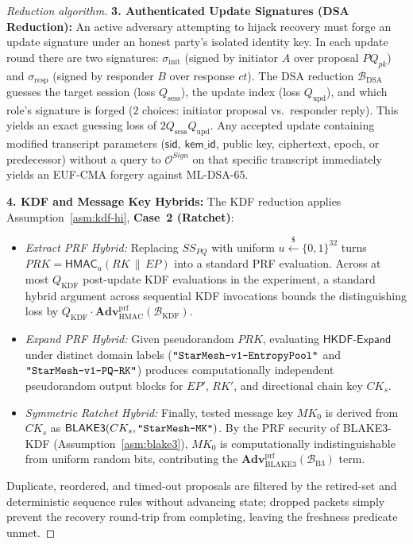 \documentclass[11pt,a4paper]{article}
\theoremstyle{remark}
\theoremstyle{plain}
\newcommand{\Adv}{\mathbf{Adv}}
\newcommand{\calO}{\mathcal{O}}
\newcommand{\bits}{\{0,1\}}
\newcommand{\getsr}{\stackrel{\$}{\leftarrow}}
\newcommand{\HKDFExpand}{\mathsf{HKDF\text{-}Expand}}
\newcommand{\HMAC}{\mathsf{HMAC}}
\newcommand{\strlit}[1]{\text{\upshape\texttt{"#1"}}}
\begin{document}
\begin{proof}[Reduction algorithm]
\medskip\noindent
\textbf{3. Authenticated Update Signatures (DSA Reduction):}
An active adversary attempting to hijack recovery must forge an update signature under an honest party's isolated identity key.  In each update round there are two signatures: $\sigma_{\mathrm{init}}$ (signed by initiator $A$ over proposal $PQ_{pk}$) and $\sigma_{\mathrm{resp}}$ (signed by responder $B$ over response $ct$).  The DSA reduction $\mathcal{B}_{\mathrm{DSA}}$ guesses the target session (loss $Q_{\mathrm{sess}}$), the update index (loss $Q_{\mathrm{upd}}$), and which role's signature is forged ($2$ choices: initiator proposal vs.\ responder reply).  This yields an exact guessing loss of $2 Q_{\mathrm{sess}} Q_{\mathrm{upd}}$.  Any accepted update containing modified transcript parameters ($\mathsf{sid}$, $\mathsf{kem\_id}$, public key, ciphertext, epoch, or predecessor) without a query to $\calO^{Sign}$ on that specific transcript immediately yields an EUF-CMA forgery against ML-DSA-65.

\medskip\noindent
\textbf{4. KDF and Message Key Hybrids:}
The KDF reduction applies Assumption~\ref{asm:kdf-hi}, \textbf{Case~2 (Ratchet)}:
\begin{itemize}
  \item \textit{Extract PRF Hybrid:} Replacing $SS_{PQ}$ with uniform $u \getsr \bits^{32}$ turns $PRK = \HMAC_u(RK \,\|\, EP)$ into a standard PRF evaluation.  Across at most $Q_{\mathrm{KDF}}$ post-update KDF evaluations in the experiment, a standard hybrid argument across sequential KDF invocations bounds the distinguishing loss by $Q_{\mathrm{KDF}} \cdot \Adv^{\mathrm{prf}}_{\mathrm{HMAC}}(\mathcal{B}_{\mathrm{KDF}})$.
  \item \textit{Expand PRF Hybrid:} Given pseudorandom $PRK$, evaluating $\HKDFExpand$ under distinct domain labels ($\strlit{StarMesh-v1-EntropyPool}$ and $\strlit{StarMesh-v1-PQ-RK}$) produces computationally independent pseudorandom output blocks for $EP'$, $RK'$, and directional chain key $CK_s$.
  \item \textit{Symmetric Ratchet Hybrid:} Finally, tested message key $MK_0$ is derived from $CK_s$ as
    $\mathsf{BLAKE3}(CK_s, \strlit{StarMesh-MK})$.
    By the PRF security of BLAKE3-KDF (Assumption~\ref{asm:blake3}), $MK_0$ is computationally
    indistinguishable from uniform random bits, contributing the $\Adv^{\mathrm{prf}}_{\mathrm{BLAKE3}}(\mathcal{B}_{\mathrm{B3}})$ term.
\end{itemize}
Duplicate, reordered, and timed-out proposals are filtered by the retired-set and deterministic sequence rules without advancing state; dropped packets simply prevent the recovery round-trip from completing, leaving the freshness predicate unmet.
\end{proof}
\end{document}
